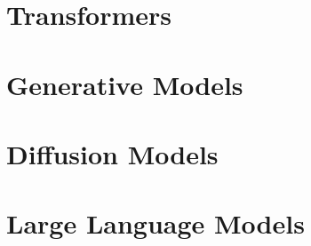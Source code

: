 \documentclass[11pt,fleqn,oneside]{book} %
\begin{document}
\newpage
\chapter{Transformers}


\newpage
\chapter{Generative Models}


\newpage
\chapter{Diffusion Models}


\newpage
\chapter{Large Language Models}


\newpage \ \newpage

\listoffigures
\listoftables

\end{document}

